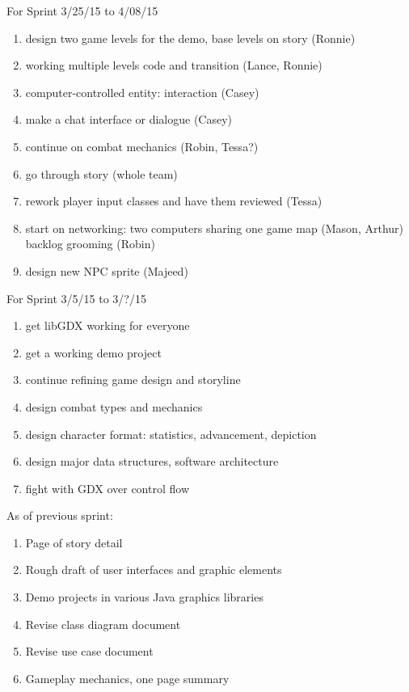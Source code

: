 \documentclass[12pt]{article}
\begin{document}
\begin{section}{For Sprint 3/25/15 to 4/08/15}
\begin{enumerate}
\item design two game levels for the demo, base levels on story (Ronnie)
\item working multiple levels code and transition (Lance, Ronnie)
\item computer-controlled entity: interaction (Casey)
\item make a chat interface or dialogue (Casey)
\item continue on combat mechanics (Robin, Tessa?)
\item go through story (whole team)
\item rework player input classes and have them reviewed (Tessa) 
\item start on networking: two computers sharing one game map (Mason, Arthur)
\itm backlog grooming (Robin)
\item design new NPC sprite (Majeed)
\end{enumerate}
\end{section}



\begin{section}{For Sprint 3/5/15 to 3/?/15}
\begin{enumerate}

\item get libGDX working for everyone
\item get a working demo project

\item continue refining game design and storyline
\item design combat types and mechanics
\item design character format: statistics, advancement, depiction
\item design major data structures, software architecture

\item fight with GDX over control flow


\end{enumerate}
\end{section}


\begin{section}{As of previous sprint:}
\begin{enumerate}
\item Page of story detail
\item Rough draft of user interfaces and graphic elements
\item Demo projects in various Java graphics libraries
\item Revise class diagram document
\item Revise use case document
\item Gameplay mechanics, one page summary
\end{enumerate}
\end{section}
\end{document}
